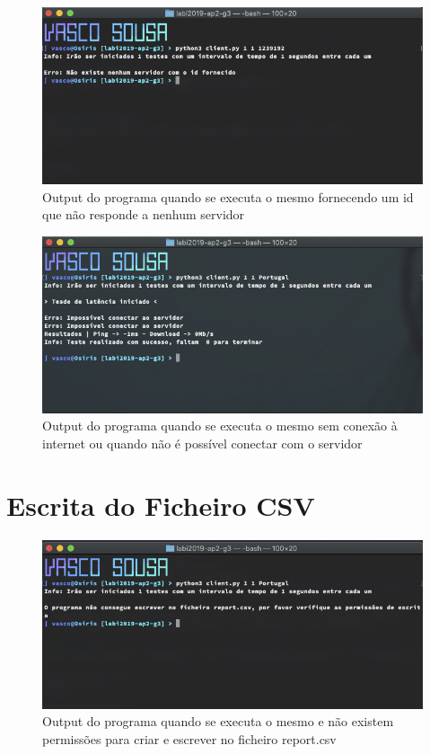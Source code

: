 \documentclass{report}
\begin{document}
\begin{figure}[h!]
    \includegraphics[width=\linewidth]{ss5.jpg}
    \caption{Output do programa quando se executa o mesmo fornecendo um id que não responde a nenhum servidor }
    \label{fig:wrongcountry}
\end{figure}

\begin{figure}[h!]
    \includegraphics[width=\linewidth]{ss4.jpg}
    \caption{Output do programa quando se executa o mesmo sem conexão à internet ou quando não é possível conectar com o servidor }
    \label{fig:noconnection}
\end{figure}

\newpage
\section{Escrita do Ficheiro CSV}
\begin{figure}[h!]
    \includegraphics[width=\linewidth]{ss8.jpg}
    \caption{Output do programa quando se executa o mesmo e não existem permissões para criar e escrever no ficheiro report.csv }
    \label{fig:noconnection}
\end{figure}
\end{document}
